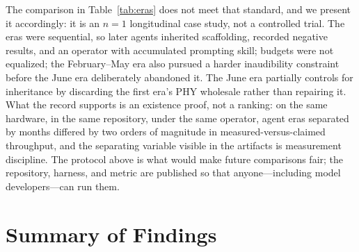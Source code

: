 \documentclass[11pt]{article}
\begin{document}
The comparison in Table~\ref{tab:eras} does not meet that standard, and we
present it accordingly: it is an $n{=}1$ longitudinal case study, not a
controlled trial. The eras were sequential, so later agents inherited
scaffolding, recorded negative results, and an operator with accumulated
prompting skill; budgets were not equalized; the February--May era also
pursued a harder inaudibility constraint before the June era deliberately
abandoned it. The June era partially controls for inheritance by discarding
the first era's PHY wholesale rather than repairing it. What the record
supports is an existence proof, not a ranking: on the same hardware, in the
same repository, under the same operator, agent eras separated by months
differed by two orders of magnitude in measured-versus-claimed throughput,
and the separating variable visible in the artifacts is measurement
discipline. The protocol above is what would make future comparisons fair;
the repository, harness, and metric are published so that anyone---including
model developers---can run them.

\section{Summary of Findings}
\end{document}
